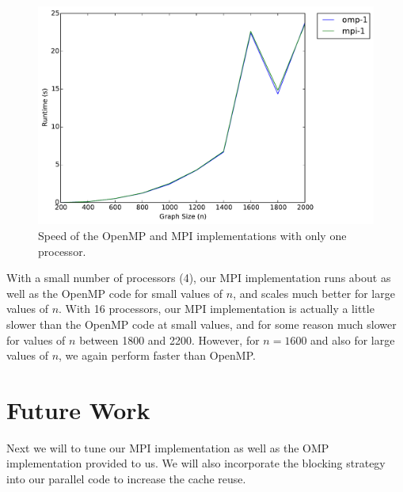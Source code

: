 \documentclass[11pt]{article}
\begin{document}
\begin{figure}[h]
	\centering
	\includegraphics[width=.8\textwidth]{serial.pdf}
	\caption{Speed of the OpenMP and MPI implementations with only one processor.}
	\label{fig:serial}
\end{figure}

With a small number of processors (4), our MPI implementation runs about as well as the OpenMP code for small values of $n$, and scales much better for large values of $n$.
With 16 processors, our MPI implementation is actually a little slower than the OpenMP code at small values, and for some reason much slower for values of $n$ between 1800 and 2200.
However, for $n = 1600$ and also for large values of $n$, we again perform faster than OpenMP.
 
 
\section{Future Work}
Next we will to tune our MPI implementation as well as the OMP implementation provided to us. We will also incorporate the blocking strategy into our parallel code to increase the cache reuse.
 
\end{document}
